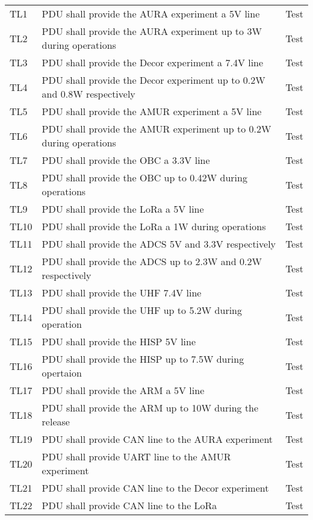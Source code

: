 \begin{longtable}{p{1cm}p{11cm}p{2cm}}
TL1 & PDU shall provide the AURA experiment a 5V line & Test\\
TL2 & PDU shall provide the AURA experiment up to 3W during operations & Test\\
TL3 & PDU shall provide the Decor experiment a 7.4V line & Test\\
TL4 & PDU shall provide the Decor experiment up to 0.2W and 0.8W respectively & Test\\
TL5 & PDU shall provide the AMUR experiment a 5V line & Test\\
TL6 & PDU shall provide the AMUR experiment up to 0.2W during operations & Test\\
TL7 & PDU shall provide the OBC a 3.3V line & Test\\
TL8 & PDU shall provide the OBC up to 0.42W during operations & Test\\
TL9 & PDU shall provide the LoRa a 5V line & Test\\
TL10 & PDU shall provide the LoRa a 1W during operations & Test\\
TL11 & PDU shall provide the ADCS 5V and 3.3V respectively & Test\\
TL12 & PDU shall provide the ADCS up to 2.3W and 0.2W respectively & Test\\
TL13 & PDU shall provide the UHF 7.4V line & Test\\
TL14 & PDU shall provide the UHF up to 5.2W during operation & Test\\
TL15 & PDU shall provide the HISP 5V line & Test\\
TL16 & PDU shall provide the HISP up to 7.5W during opertaion & Test\\
TL17 & PDU shall provide the ARM a 5V line & Test\\
TL18 & PDU shall provide the ARM up to 10W during the release & Test\\ 
TL19 & PDU shall provide CAN line to the AURA experiment & Test\\
TL20 & PDU shall provide UART line to the AMUR experiment & Test\\
TL21 & PDU shall provide CAN line to the Decor experiment & Test\\
TL22 & PDU shall provide CAN line to the LoRa & Test\\
\bottomrule
\end{longtable}
\label{Tab:req1}



